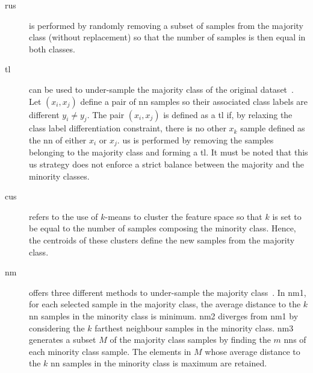 \begin{description}
  \item[\Ac{rus}] is performed by randomly removing a subset of samples from the majority class (without replacement) so that the number of samples is then equal in both classes.
  \item[\Ac{tl}] can be used to under-sample the majority class of the original dataset~\cite{tomek1976two}.
Let $(x_i, x_j)$ define a pair of \ac{nn} samples so their associated class labels are different $y_i \neq y_j$.
The pair $(x_i, x_j)$ is defined as a \ac{tl} if, by relaxing the class label differentiation constraint, there is no other $x_k$ sample defined as the \ac{nn} of either $x_i$ or $x_j$.
\Ac{us} is performed by removing the samples belonging to the majority class and forming a \ac{tl}.
It must be noted that this \ac{us} strategy does not enforce a strict balance between the majority and the minority classes.

  \item[\Ac{cus}] refers to the use of $k$-means to cluster the feature space so that $k$ is set to be equal to the number of samples composing the minority class.
Hence, the centroids of these clusters define the new samples from the majority class. 
 
  \item[\Ac{nm}] offers three different methods to under-sample the majority class~\cite{mani2003knn}.
In \ac{nm1}, for each selected sample in the majority class, the average distance to the $k$ \ac{nn} samples in the minority class is minimum.
\ac{nm2} diverges from \ac{nm1} by considering the $k$ farthest neighbour samples in the minority class.
\ac{nm3} generates a subset $M$ of the majority class samples by finding the $m$ \ac{nn}s of each minority class sample.
The elements in $M$ whose average distance to the $k$ \ac{nn} samples in the minority class is maximum are retained.
  

\end{description}
